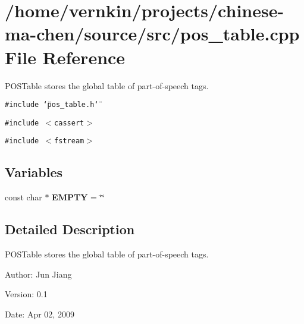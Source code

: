\section{/home/vernkin/projects/chinese-ma-chen/source/src/pos\_\-table.cpp File Reference}
\label{pos__table_8cpp}
POSTable stores the global table of part-of-speech tags.  


{\tt \#include \char`\"{}pos\_\-table.h\char`\"{}}\par
{\tt \#include $<$cassert$>$}\par
{\tt \#include $<$fstream$>$}\par
\subsection*{Variables}
\begin{CompactItemize}
\item 
const char $\ast$ \textbf{EMPTY} = \char`\"{}\char`\"{}\label{pos__table_8cpp_d7f4cc3faf0602bfdba8969c757d21e0}

\end{CompactItemize}


\subsection{Detailed Description}
POSTable stores the global table of part-of-speech tags. 

\begin{Desc}
\item[Author:]Jun Jiang \end{Desc}
\begin{Desc}
\item[Version:]0.1 \end{Desc}
\begin{Desc}
\item[Date:]Apr 02, 2009 \end{Desc}
